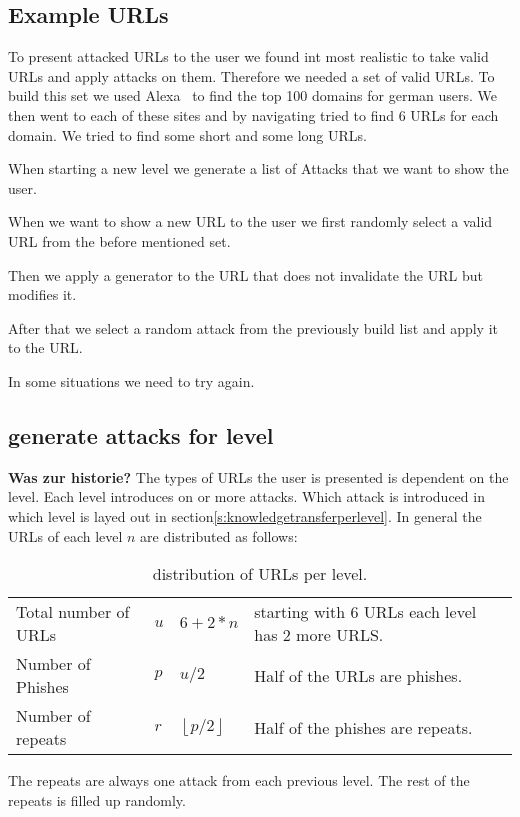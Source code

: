 \subsection{Example URLs}
To present attacked URLs to the user we found int most realistic to take valid URLs and apply attacks on them.
Therefore we needed a set of valid URLs.
To build this set we used Alexa~\cite{alexa} to find the top 100 domains for german users.
We then went to each of these sites and by navigating tried to find 6 URLs for each domain.
We tried to find some short and some long URLs.
\begin{description}[leftmargin=0cm]
\item[generate attacks for level]When starting a new level we generate a list of Attacks that we want to show the user.
\item[select valid URL]When we want to show a new URL to the user we first randomly select a valid URL from the before mentioned set.
\item[apply generator]Then we apply a generator to the URL that does not invalidate the URL but modifies it.
\item[apply attack]After that we select a random attack from the previously build list and apply it to the URL.
\item[repeat]In some situations we need to try again.
\end{description}
\subsection{generate attacks for level}
\textbf{Was zur historie?}
The types of URLs the user is presented is dependent on the level.
Each level introduces on or more attacks.
Which attack is introduced in which level is layed out in section\autoref{s:knowledgetransferperlevel}.
In general the URLs of each level $n$ are distributed as follows:
\begin{table}[hHtbp]
\centering
\begin{tabular}{llll}
Total number of URLs&$u$&$6+2*n$&starting with 6 URLs each level has 2 more URLS.\\
Number of Phishes&$p$&$u/2$&Half of the URLs are phishes.\\
Number of repeats&$r$&$\left\lfloor p/2 \right\rfloor$&Half of the phishes are repeats.
\end{tabular}
\caption{distribution of URLs per level.}
\label{t:levelurls}
\end{table}

The repeats are always one attack from each previous level. The rest of the repeats is filled up randomly.

